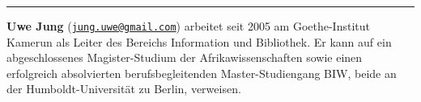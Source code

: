 \documentclass[a4paper,
fontsize=11pt,
oneside,
numbers=noperiodatend,
parskip=half-,
bibliography=totoc,
final
]{scrartcl}
\begin{document}
\begin{center}\rule{0.5\linewidth}{\linethickness}\end{center}

\textbf{Uwe Jung}
(\href{mailto:jung.uwe@gmail.com}{\nolinkurl{jung.uwe@gmail.com}})
arbeitet seit 2005 am Goethe-Institut Kamerun als Leiter des Bereichs
Information und Bibliothek. Er kann auf ein abgeschlossenes
Magister-Studium der Afrikawissenschaften sowie einen erfolgreich
absolvierten berufsbegleitenden Master-Studiengang BIW, beide an der
Humboldt-Universität zu Berlin, verweisen.
\end{document}
